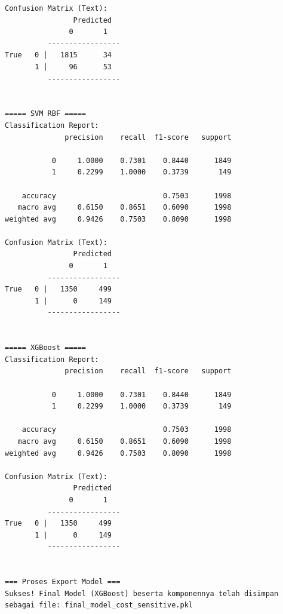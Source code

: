 \begin{lstlisting}[caption={Output 7}]
Confusion Matrix (Text):
                Predicted
               0       1
          -----------------
True   0 |   1815      34
       1 |     96      53
          -----------------


===== SVM RBF =====
Classification Report:
              precision    recall  f1-score   support

           0     1.0000    0.7301    0.8440      1849
           1     0.2299    1.0000    0.3739       149

    accuracy                         0.7503      1998
   macro avg     0.6150    0.8651    0.6090      1998
weighted avg     0.9426    0.7503    0.8090      1998

Confusion Matrix (Text):
                Predicted
               0       1
          -----------------
True   0 |   1350     499
       1 |      0     149
          -----------------


===== XGBoost =====
Classification Report:
              precision    recall  f1-score   support

           0     1.0000    0.7301    0.8440      1849
           1     0.2299    1.0000    0.3739       149

    accuracy                         0.7503      1998
   macro avg     0.6150    0.8651    0.6090      1998
weighted avg     0.9426    0.7503    0.8090      1998

Confusion Matrix (Text):
                Predicted
               0       1
          -----------------
True   0 |   1350     499
       1 |      0     149
          -----------------


=== Proses Export Model ===
Sukses! Final Model (XGBoost) beserta komponennya telah disimpan sebagai file: final_model_cost_sensitive.pkl
\end{lstlisting}

